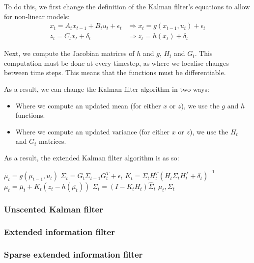 \documentclass{article}
\begin{document}
To do this, we first change the definition of the Kalman filter's equations to
allow for non-linear models:
\begin{align*}
  x_t = A_t x_{t-1} + B_t u_t + \epsilon_t &\Longrightarrow
    x_t = g(x_{t-1}, u_t) + \epsilon_t \\
  z_t = C_t x_t + \delta_t &\Longrightarrow
    z_t = h(x_t) + \delta_t
\end{align*}

Next, we compute the Jacobian matrices of $h$ and $g$, $H_t$ and $G_t$. This
computation must be done at every timestep, as where we localise changes
between time steps. This means that the functions must be differentiable.

As a result, we can change the Kalman filter algorithm in two ways:
\begin{itemize}
  \item Where we compute an updated mean (for either $x$ or $z$), we use the
    $g$ and $h$ functions.
  \item Where we compute an updated variance (for either $x$ or $z$), we use
    the $H_t$ and $G_t$ matrices.
\end{itemize}

As a result, the extended Kalman filter algorithm is as so:
\begin{algorithmic}[1]
    \State$\bar{\mu}_t = g(\mu_{t-1}, u_t)$
    \State$\bar{\Sigma}_t = G_t \Sigma_{t-1}G_t^T + \epsilon_t$
    \State$K_t =
      \bar{\Sigma}_t H_t^T{(H_t \bar{\Sigma}_t H_t^T + \delta_t)}^{-1}$
    \State$\mu_t = \bar{\mu}_t + K_t(z_t - h(\bar{\mu_t}))$
    \State$\Sigma_t = (I - K_t H_t)\hat{\Sigma}_t$
    \State\Return$\mu_t, \Sigma_t$
  \EndProcedure{}
\end{algorithmic}

\subsubsection{Unscented Kalman filter}

\subsubsection{Extended information filter}

\subsubsection{Sparse extended information filter}
\end{document}

